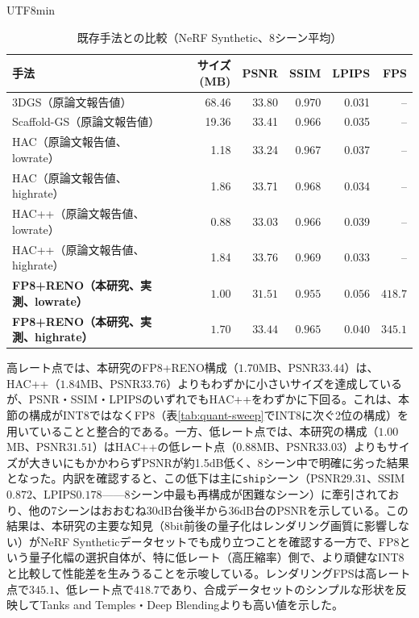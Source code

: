\documentclass{ieeeaccess}
\begin{document}
\begin{CJK}{UTF8}{min}
\begin{table}[!t]
\renewcommand{\arraystretch}{1.2}
\caption{既存手法との比較（NeRF Synthetic、8シーン平均）}
\label{tab:literature-synth}
\centering
\begin{tabular}{p{5.2cm}rrrrr}
\toprule
手法 & サイズ (MB) & PSNR & SSIM & LPIPS & FPS \\
\midrule
3DGS\cite{kerbl20233d}（原論文報告値） & 68.46 & 33.80 & 0.970 & 0.031 & -- \\
Scaffold-GS\cite{lu2024scaffold}（原論文報告値） & 19.36 & 33.41 & 0.966 & 0.035 & -- \\
HAC\cite{chen2024hac}（原論文報告値、lowrate） & 1.18 & 33.24 & 0.967 & 0.037 & -- \\
HAC\cite{chen2024hac}（原論文報告値、highrate） & 1.86 & 33.71 & 0.968 & 0.034 & -- \\
HAC++\cite{chen2025hacpp}（原論文報告値、lowrate） & 0.88 & 33.03 & 0.966 & 0.039 & -- \\
HAC++\cite{chen2025hacpp}（原論文報告値、highrate） & 1.84 & 33.76 & 0.969 & 0.033 & -- \\
\midrule
\textbf{FP8+RENO（本研究、実測、lowrate）} & $\mathbf{1.00}$ & $\mathbf{31.51}$ & $\mathbf{0.955}$ & $\mathbf{0.056}$ & $\mathbf{418.7}$ \\
\textbf{FP8+RENO（本研究、実測、highrate）} & $\mathbf{1.70}$ & $\mathbf{33.44}$ & $\mathbf{0.965}$ & $\mathbf{0.040}$ & $\mathbf{345.1}$ \\
\bottomrule
\end{tabular}
\end{table}

高レート点では、本研究のFP8+RENO構成（$1.70$MB、PSNR$33.44$）は、HAC++（$1.84$MB、PSNR$33.76$）よりもわずかに小さいサイズを達成しているが、PSNR・SSIM・LPIPSのいずれでもHAC++をわずかに下回る。これは、本節の構成がINT8ではなくFP8（表\ref{tab:quant-sweep}でINT8に次ぐ2位の構成）を用いていることと整合的である。一方、低レート点では、本研究の構成（$1.00$MB、PSNR$31.51$）はHAC++の低レート点（$0.88$MB、PSNR$33.03$）よりもサイズが大きいにもかかわらずPSNRが約1.5dB低く、8シーン中で明確に劣った結果となった。内訳を確認すると、この低下は主に\texttt{ship}シーン（PSNR$29.31$、SSIM$0.872$、LPIPS$0.178$——8シーン中最も再構成が困難なシーン）に牽引されており、他の7シーンはおおむね30dB台後半から36dB台のPSNRを示している。この結果は、本研究の主要な知見（8bit前後の量子化はレンダリング画質に影響しない）がNeRF Syntheticデータセットでも成り立つことを確認する一方で、FP8という量子化幅の選択自体が、特に低レート（高圧縮率）側で、より頑健なINT8と比較して性能差を生みうることを示唆している。レンダリングFPSは高レート点で$345.1$、低レート点で$418.7$であり、合成データセットのシンプルな形状を反映してTanks and Temples・Deep Blendingよりも高い値を示した。


\end{CJK}
\end{document}

